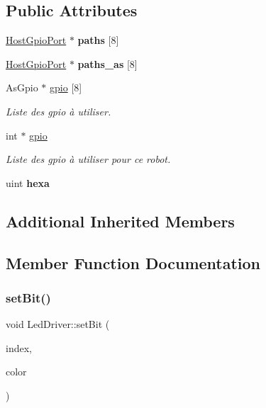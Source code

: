 \subsection*{Public Attributes}
\begin{DoxyCompactItemize}
\item 
\mbox{\label{classLedDriver_ad6006ec56efcaf26e5f91e37ba14b1e3}} 
\hyperlink{classHostGpioPort}{Host\+Gpio\+Port} $\ast$ {\bfseries paths} \mbox{[}8\mbox{]}
\item 
\mbox{\label{classLedDriver_aebefe9a5abc5b31601c4eca02a37d5c7}} 
\hyperlink{classHostGpioPort}{Host\+Gpio\+Port} $\ast$ {\bfseries paths\+\_\+as} \mbox{[}8\mbox{]}
\item 
As\+Gpio $\ast$ \hyperlink{classLedDriver_adaaa4082a4a290b5f1991c834ee207bd}{gpio} \mbox{[}8\mbox{]}
\begin{DoxyCompactList}\small\item\em Liste des gpio à utiliser. \end{DoxyCompactList}\item 
\mbox{\label{classLedDriver_a0b00f1c3743bac73279dbef5dde4cfd0}} 
int $\ast$ \hyperlink{classLedDriver_a0b00f1c3743bac73279dbef5dde4cfd0}{gpio}
\begin{DoxyCompactList}\small\item\em Liste des gpio à utiliser pour ce robot. \end{DoxyCompactList}\item 
\mbox{\label{classLedDriver_a7e41b321ba077e0bbc54cf850c487e0f}} 
uint {\bfseries hexa}
\end{DoxyCompactItemize}
\subsection*{Additional Inherited Members}


\subsection{Member Function Documentation}
\mbox{\label{classLedDriver_af5ec63943cb92b14a887fdd2a5491e93}} 
\subsubsection{\texorpdfstring{set\+Bit()}{setBit()}\hspace{0.1cm}{\footnotesize\ttfamily [1/5]}}
{\footnotesize\ttfamily void Led\+Driver\+::set\+Bit (\begin{DoxyParamCaption}\item[{int}]{index,  }\item[{Led\+Color}]{color }\end{DoxyParamCaption})\hspace{0.3cm}{\ttfamily [virtual]}}



